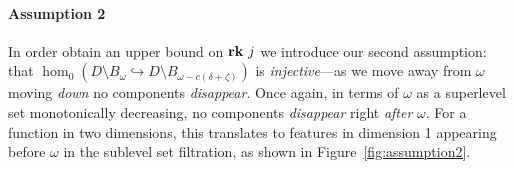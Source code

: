 \paragraph{Assumption 2}

In order obtain an upper bound on $\mathbf{rk}~j$ we introduce our second assumption: that $\hom_0(D\setminus B_\omega\hookrightarrow D\setminus B_{\omega-c(\delta+\zeta)})$ is \emph{injective}---as we move away from $\omega$ moving \emph{down} no components \emph{disappear}.
Once again, in terms of $\omega$ as a superlevel set monotonically decreasing, no components \emph{disappear} right \emph{after} $\omega$.
For a function in two dimensions, this translates to features in dimension 1 appearing before $\omega$ in the sublevel set filtration, as shown in Figure~\ref{fig:assumption2}.


